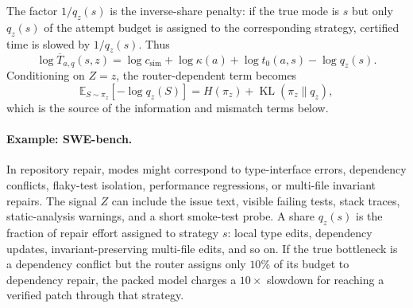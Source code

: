 \documentclass{article}
\newtheorem{definition}{Definition}
\DeclareMathOperator{\KL}{KL}
\newcommand{\cT}{\mathcal{T}}
\newcommand{\cX}{\mathcal{X}}
\newcommand{\cY}{\mathcal{Y}}
\newcommand{\E}{\mathbb{E}}
\begin{document}
The factor \(1/q_z(s)\) is the inverse-share penalty: if the true mode is \(s\) but only
\(q_z(s)\) of the attempt budget is assigned to the corresponding strategy, certified time
is slowed by \(1/q_z(s)\).
Thus
\[
    \log \overline T_{a,q}(s,z)
    =
    \log c_{\mathrm{sim}}+\log\kappa(a)+\log t_0(a,s)-\log q_z(s).
\]
Conditioning on \(Z=z\), the router-dependent term becomes
\[
    \E_{S\sim\pi_z}[-\log q_z(S)]
    =
    H(\pi_z)+\KL(\pi_z\|q_z),
\]
which is the source of the information and mismatch terms below.

\paragraph{Example: SWE-bench.}
In repository repair, modes might correspond to type-interface errors, dependency conflicts,
flaky-test isolation, performance regressions, or multi-file invariant repairs.
The signal \(Z\) can include the issue text, visible failing tests, stack traces, static-analysis
warnings, and a short smoke-test probe.
A share \(q_z(s)\) is the fraction of repair effort assigned to strategy \(s\): local type edits,
dependency updates, invariant-preserving multi-file edits, and so on.
If the true bottleneck is a dependency conflict but the router assigns only \(10\%\) of its
budget to dependency repair, the packed model charges a \(10\times\) slowdown for reaching
a verified patch through that strategy.


\end{document}
